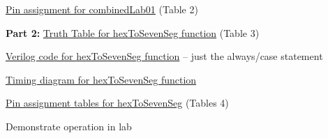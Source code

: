 \protect\hyperlink{CombinedLab01_Pin_assignment}{Pin assignment for
combinedLab01} (Table 2)

\textbf{Part 2:} \protect\hyperlink{Hex2Seven_TruthTable}{Truth Table
for hexToSevenSeg function} (Table 3)

\protect\hyperlink{Hex2Seven_Verilog}{Verilog code for hexToSevenSeg
function} -- just the always/case statement

\protect\hyperlink{Hex2Seven_Waveform}{Timing diagram for hexToSevenSeg
function}

\protect\hyperlink{Hex2Seven_PinAssignment}{Pin assignment tables for
hexToSevenSeg} (Tables 4)

Demonstrate operation in lab


